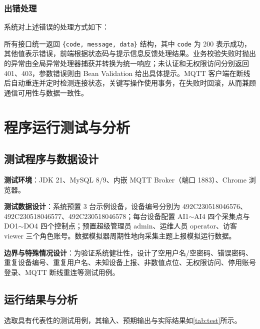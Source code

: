 \documentclass[12pt,hyperref,a4paper,UTF8]{ctexart}
\begin{document}
\subsubsection{出错处理}

系统对上述错误的处理方式如下：

所有接口统一返回 \texttt{\{code, message, data\}} 结构，其中 \texttt{code} 为 200 表示成功，其他值表示错误，前端根据状态码与提示信息反馈处理结果。业务校验失败时抛出的异常由全局异常处理器捕获并转换为统一响应；未认证和无权限访问分别返回 401、403，参数错误则由 Bean Validation 给出具体提示。MQTT 客户端在断线后自动重连并定时检测连接状态，关键写操作使用事务，在失败时回滚，从而兼顾通信可用性与数据一致性。

\section{程序运行测试与分析}

\subsection{测试程序与数据设计}

\textbf{测试环境}：JDK 21、MySQL 8/9、内嵌 MQTT Broker（端口 1883）、Chrome 浏览器。

\textbf{测试数据设计}：系统预置 3 台示例设备，设备编号分别为 492C230518046576、492C230518046577、492C230518046578；每台设备配置 AI1$\sim$AI4 四个采集点与 DO1$\sim$DO4 四个控制点；预置超级管理员 admin、运维人员 operator、访客 viewer 三个角色账号。数据模拟器周期性地向采集主题上报模拟运行数据。

\textbf{边界与特殊情况设计}：为验证系统健壮性，设计了空用户名/空密码、错误密码、重复设备编号、重复用户名、未知设备上报、非数值点位、无权限访问、停用账号登录、MQTT 断线重连等测试用例。

\subsection{运行结果与分析}

选取具有代表性的测试用例，其输入、预期输出与实际结果如\autoref{tab:test}所示。
\end{document}
